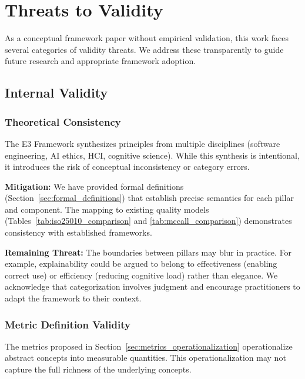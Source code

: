 
\section{Threats to Validity}
\label{sec:threats_to_validity}

As a conceptual framework paper without empirical validation, this work faces several categories of validity threats. We address these transparently to guide future research and appropriate framework adoption.

\subsection{Internal Validity}

\subsubsection{Theoretical Consistency}

The E3 Framework synthesizes principles from multiple disciplines (software engineering, AI ethics, HCI, cognitive science). While this synthesis is intentional, it introduces the risk of conceptual inconsistency or category errors.

\textbf{Mitigation:} We have provided formal definitions (Section~\ref{sec:formal_definitions}) that establish precise semantics for each pillar and component. The mapping to existing quality models (Tables~\ref{tab:iso25010_comparison} and \ref{tab:mccall_comparison}) demonstrates consistency with established frameworks.

\textbf{Remaining Threat:} The boundaries between pillars may blur in practice. For example, explainability could be argued to belong to effectiveness (enabling correct use) or efficiency (reducing cognitive load) rather than elegance. We acknowledge that categorization involves judgment and encourage practitioners to adapt the framework to their context.

\subsubsection{Metric Definition Validity}

The metrics proposed in Section~\ref{sec:metrics_operationalization} operationalize abstract concepts into measurable quantities. This operationalization may not capture the full richness of the underlying concepts.

